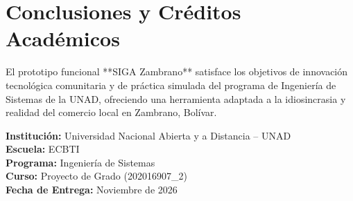 \documentclass[12pt,a4paper]{article}
\begin{document}
\section{Conclusiones y Créditos Académicos}

El prototipo funcional **SIGA Zambrano** satisface los objetivos de innovación tecnológica comunitaria y de práctica simulada del programa de Ingeniería de Sistemas de la UNAD, ofreciendo una herramienta adaptada a la idiosincrasia y realidad del comercio local en Zambrano, Bolívar.

\vspace{0.5cm}
\noindent \textbf{Institución:} Universidad Nacional Abierta y a Distancia -- UNAD \\
\textbf{Escuela:} ECBTI \\
\textbf{Programa:} Ingeniería de Sistemas \\
\textbf{Curso:} Proyecto de Grado (202016907\_2) \\
\textbf{Fecha de Entrega:} Noviembre de 2026
\end{document}
